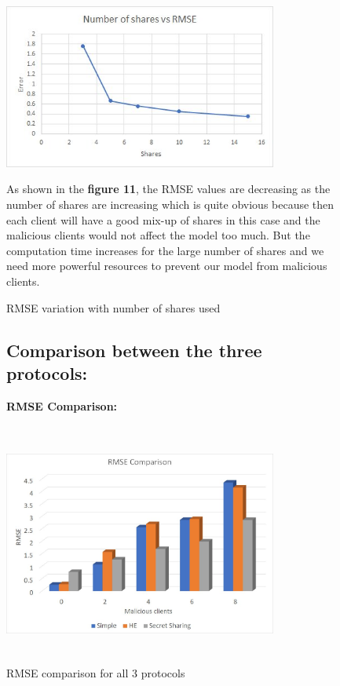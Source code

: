 \documentclass[conference]{IEEEtran}
\begin{document}
\begin{figure}

\includegraphics[width=90mm,scale=0.7]{numberofshares.jpeg}

\caption{ RMSE  variation  with  number  of shares used}

\vspace{\baselineskip}

As shown in the \textbf{figure 11}, the RMSE values are decreasing as the number of shares are increasing which is quite obvious because then each client will have a good mix-up of shares in this case and the malicious clients would not affect the model too much. But the computation time increases for the large number of shares and we need more powerful resources to prevent our model from malicious clients.

\end{figure}

\begin{figure}

\subsection{Comparison between the three protocols:}

\vspace{\baselineskip}

\textbf{RMSE Comparison:}

\vspace{\baselineskip}

\includegraphics[width=90mm,height=80mm,scale=0.7]{secret_Simple_HE.jpeg}

\caption{ RMSE comparison for all 3 protocols}

\end{figure}
\end{document}
